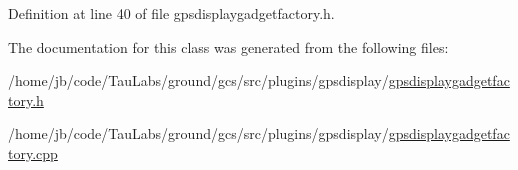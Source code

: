 \-Definition at line 40 of file gpsdisplaygadgetfactory.\-h.



\-The documentation for this class was generated from the following files\-:\begin{DoxyCompactItemize}
\item 
/home/jb/code/\-Tau\-Labs/ground/gcs/src/plugins/gpsdisplay/\hyperlink{gpsdisplaygadgetfactory_8h}{gpsdisplaygadgetfactory.\-h}\item 
/home/jb/code/\-Tau\-Labs/ground/gcs/src/plugins/gpsdisplay/\hyperlink{gpsdisplaygadgetfactory_8cpp}{gpsdisplaygadgetfactory.\-cpp}\end{DoxyCompactItemize}
